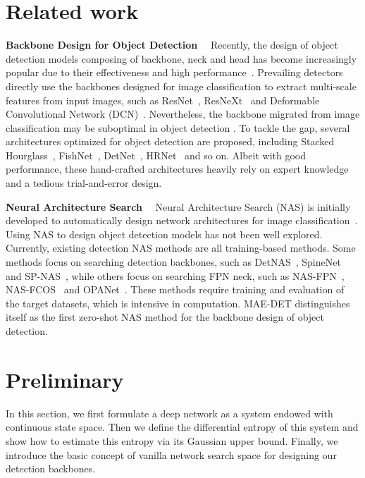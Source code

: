 \documentclass[nohyperref]{article}
\theoremstyle{plain}
\theoremstyle{definition}
\theoremstyle{remark}
\begin{document}
\section{Related work} 
\noindent\textbf{Backbone Design for Object Detection}$\quad$
Recently, the design of object detection models composing of backbone, neck and head has become increasingly popular due to their effectiveness and high performance~\citep{fpn,retinanet,fcos,gfv1,gfv2,bifpn,giraffedet}.
Prevailing detectors directly use the backbones designed for image classification to extract multi-scale features from input images, such as ResNet~\citep{resnet}, ResNeXt~\citep{resnext} and Deformable Convolutional Network (DCN)~\citep{dcn}.
Nevertheless, the backbone migrated from image classification may be suboptimal in object detection \citep{nasfpn}. 
To tackle the gap, several architectures optimized for object detection are proposed, including Stacked Hourglass~\citep{hourglass}, FishNet~\citep{fishnet}, DetNet~\citep{detnet}, 
HRNet~\citep{hrnet} and so on. Albeit with good performance, these hand-crafted architectures heavily rely on expert knowledge and a tedious trial-and-error design.

\noindent\textbf{Neural Architecture Search}$\quad$ 
Neural Architecture Search (NAS) is initially developed to automatically design network architectures for image classification~\citep{nasnet,darts,abenas,ofa,darts-,mcunet,efficient,autoformer,zennas}. Using NAS to design object detection models has not been well explored. Currently, existing detection NAS methods are all training-based methods. Some methods focus on searching detection backbones, such as DetNAS~\citep{detnas}, SpineNet~\citep{spinenet} and SP-NAS~\citep{spnas}, while others focus on searching FPN neck, such as NAS-FPN~\citep{nasfpn}, NAS-FCOS~\citep{nasfcos} and OPANet~\citep{opanas}. These methods require training and evaluation of the target datasets, which is intensive in computation. MAE-DET distinguishes itself as the first zero-shot NAS method for the backbone design of object detection.

\section{Preliminary}
\label{sec:Preliminary}

In this section, we first formulate a deep network as a system endowed with continuous state space. Then we define the differential entropy of this system and show how to estimate this entropy via its Gaussian upper bound. Finally, we introduce the basic concept of vanilla network search space for designing our detection backbones.
\end{document}
